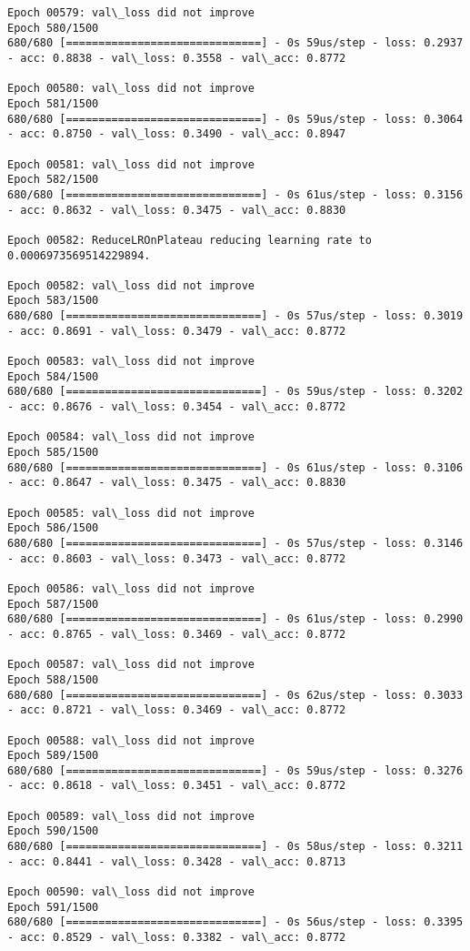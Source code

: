 \documentclass[11pt]{article}
\begin{document}
\begin{Verbatim}[commandchars=\\\{\}]
Epoch 00579: val\_loss did not improve
Epoch 580/1500
680/680 [==============================] - 0s 59us/step - loss: 0.2937 - acc: 0.8838 - val\_loss: 0.3558 - val\_acc: 0.8772

Epoch 00580: val\_loss did not improve
Epoch 581/1500
680/680 [==============================] - 0s 59us/step - loss: 0.3064 - acc: 0.8750 - val\_loss: 0.3490 - val\_acc: 0.8947

Epoch 00581: val\_loss did not improve
Epoch 582/1500
680/680 [==============================] - 0s 61us/step - loss: 0.3156 - acc: 0.8632 - val\_loss: 0.3475 - val\_acc: 0.8830

Epoch 00582: ReduceLROnPlateau reducing learning rate to 0.0006973569514229894.

Epoch 00582: val\_loss did not improve
Epoch 583/1500
680/680 [==============================] - 0s 57us/step - loss: 0.3019 - acc: 0.8691 - val\_loss: 0.3479 - val\_acc: 0.8772

Epoch 00583: val\_loss did not improve
Epoch 584/1500
680/680 [==============================] - 0s 59us/step - loss: 0.3202 - acc: 0.8676 - val\_loss: 0.3454 - val\_acc: 0.8772

Epoch 00584: val\_loss did not improve
Epoch 585/1500
680/680 [==============================] - 0s 61us/step - loss: 0.3106 - acc: 0.8647 - val\_loss: 0.3475 - val\_acc: 0.8830

Epoch 00585: val\_loss did not improve
Epoch 586/1500
680/680 [==============================] - 0s 57us/step - loss: 0.3146 - acc: 0.8603 - val\_loss: 0.3473 - val\_acc: 0.8772

Epoch 00586: val\_loss did not improve
Epoch 587/1500
680/680 [==============================] - 0s 61us/step - loss: 0.2990 - acc: 0.8765 - val\_loss: 0.3469 - val\_acc: 0.8772

Epoch 00587: val\_loss did not improve
Epoch 588/1500
680/680 [==============================] - 0s 62us/step - loss: 0.3033 - acc: 0.8721 - val\_loss: 0.3469 - val\_acc: 0.8772

Epoch 00588: val\_loss did not improve
Epoch 589/1500
680/680 [==============================] - 0s 59us/step - loss: 0.3276 - acc: 0.8618 - val\_loss: 0.3451 - val\_acc: 0.8772

Epoch 00589: val\_loss did not improve
Epoch 590/1500
680/680 [==============================] - 0s 58us/step - loss: 0.3211 - acc: 0.8441 - val\_loss: 0.3428 - val\_acc: 0.8713

Epoch 00590: val\_loss did not improve
Epoch 591/1500
680/680 [==============================] - 0s 56us/step - loss: 0.3395 - acc: 0.8529 - val\_loss: 0.3382 - val\_acc: 0.8772


\end{Verbatim}
\end{document}
